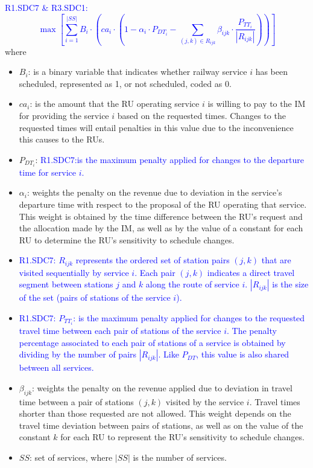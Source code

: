 \documentclass[Afour,sagev,times]{sagej}
\newcommand{\primero}[1]{\textcolor{blue}{#1}}
\begin{document}
\primero{R1.SDC7 \& R3.SDC1:
\begin{equation} \label{ecu:problem_formulation}
{\scriptstyle\max \left[ \sum_{i=1}^{|SS|} B_i \cdot \left( ca_i \cdot \left( 1 - \alpha_{i} \cdot P_{DT_{i}} - \sum_{(j,k) \in R_{ijk}} \beta_{ijk} \cdot \frac{P_{TT_{i}}}{|R_{ijk}|} \right) \right) \right]
}
\end{equation}
}
where \begin{itemize}
    \item $B_i$: is a binary variable that indicates whether railway service $i$ has been scheduled, represented as 1, or not scheduled, coded as 0. 
    \item $ca_i$: is the amount that the \gls{RU} operating service $i$ is willing to pay to the \gls{IM} for providing the service $i$ based on the requested times. Changes to the requested times will entail penalties in this value due to the inconvenience this causes to the \glspl{RU}.
    \item $P_{DT_{i}}$: \primero{R1.SDC7:is the maximum penalty applied for changes to the departure time for service $i$.}
    \item $\alpha_{i}$: weights the penalty on the revenue due to deviation in the service's departure time with respect to the proposal of the \gls{RU} operating that service. This weight is obtained by the time difference between the \gls{RU}'s request and the allocation made by the \gls{IM}, as well as by the value of a constant for each \gls{RU} to determine the \gls{RU}'s sensitivity to schedule changes.
    \item \primero{R1.SDC7: $ R_{ijk} $ represents the ordered set of station pairs $ (j,k) $ that are visited sequentially by service $i$. Each pair $(j,k)$ indicates a direct travel segment between stations $j$ and $k$ along the route of service $i$. $|R_{ijk}|$ is the size of the set (pairs of stations of the service $i$).}
    \item \primero{R1.SDC7: $P_{TT_{i}}$: is the maximum penalty applied for changes to the requested travel time between each pair of stations of the service $i$. The penalty percentage associated to each pair of stations of a service is obtained by dividing by the number of pairs $|R_{ijk}|$. Like $P_{DT}$, this value is also shared between all services.}
    \item $\beta_{ijk}$: weights the penalty on the revenue applied due to deviation in travel time between a pair of stations $(j,k)$ visited by the service $i$. Travel times shorter than those requested are not allowed. This weight depends on the travel time deviation between pairs of stations, as well as on the value of the constant $k$ for each \gls{RU} to represent the \gls{RU}'s sensitivity to schedule changes.
    \item $ SS $: set of services, where $ |SS| $ is the number of services.
\end{itemize}
\end{document}

